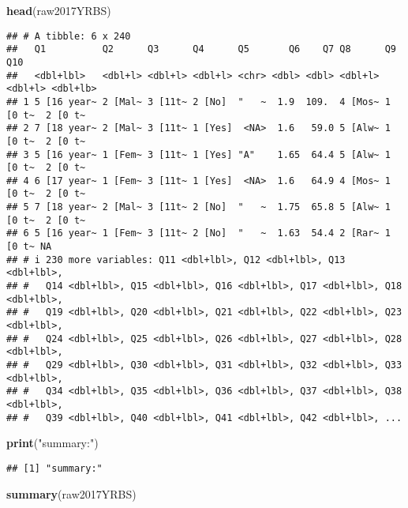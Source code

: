 \documentclass[
]{article}
\newenvironment{Shaded}{\begin{snugshade}}{\end{snugshade}}
\newcommand{\FunctionTok}[1]{\textcolor[rgb]{0.13,0.29,0.53}{\textbf{#1}}}
\newcommand{\NormalTok}[1]{#1}
\newcommand{\StringTok}[1]{\textcolor[rgb]{0.31,0.60,0.02}{#1}}
\begin{document}
\begin{Shaded}
\begin{Highlighting}[]
\FunctionTok{head}\NormalTok{(raw2017YRBS)}
\end{Highlighting}
\end{Shaded}

\begin{verbatim}
## # A tibble: 6 x 240
##   Q1          Q2      Q3      Q4      Q5       Q6    Q7 Q8      Q9      Q10     
##   <dbl+lbl>   <dbl+l> <dbl+l> <dbl+l> <chr> <dbl> <dbl> <dbl+l> <dbl+l> <dbl+lb>
## 1 5 [16 year~ 2 [Mal~ 3 [11t~ 2 [No]  "   ~  1.9  109.  4 [Mos~ 1 [0 t~  2 [0 t~
## 2 7 [18 year~ 2 [Mal~ 3 [11t~ 1 [Yes]  <NA>  1.6   59.0 5 [Alw~ 1 [0 t~  2 [0 t~
## 3 5 [16 year~ 1 [Fem~ 3 [11t~ 1 [Yes] "A"    1.65  64.4 5 [Alw~ 1 [0 t~  2 [0 t~
## 4 6 [17 year~ 1 [Fem~ 3 [11t~ 1 [Yes]  <NA>  1.6   64.9 4 [Mos~ 1 [0 t~  2 [0 t~
## 5 7 [18 year~ 2 [Mal~ 3 [11t~ 2 [No]  "   ~  1.75  65.8 5 [Alw~ 1 [0 t~  2 [0 t~
## 6 5 [16 year~ 1 [Fem~ 3 [11t~ 2 [No]  "   ~  1.63  54.4 2 [Rar~ 1 [0 t~ NA      
## # i 230 more variables: Q11 <dbl+lbl>, Q12 <dbl+lbl>, Q13 <dbl+lbl>,
## #   Q14 <dbl+lbl>, Q15 <dbl+lbl>, Q16 <dbl+lbl>, Q17 <dbl+lbl>, Q18 <dbl+lbl>,
## #   Q19 <dbl+lbl>, Q20 <dbl+lbl>, Q21 <dbl+lbl>, Q22 <dbl+lbl>, Q23 <dbl+lbl>,
## #   Q24 <dbl+lbl>, Q25 <dbl+lbl>, Q26 <dbl+lbl>, Q27 <dbl+lbl>, Q28 <dbl+lbl>,
## #   Q29 <dbl+lbl>, Q30 <dbl+lbl>, Q31 <dbl+lbl>, Q32 <dbl+lbl>, Q33 <dbl+lbl>,
## #   Q34 <dbl+lbl>, Q35 <dbl+lbl>, Q36 <dbl+lbl>, Q37 <dbl+lbl>, Q38 <dbl+lbl>,
## #   Q39 <dbl+lbl>, Q40 <dbl+lbl>, Q41 <dbl+lbl>, Q42 <dbl+lbl>, ...
\end{verbatim}

\begin{Shaded}
\begin{Highlighting}[]
\FunctionTok{print}\NormalTok{(}\StringTok{"summary:"}\NormalTok{)}
\end{Highlighting}
\end{Shaded}

\begin{verbatim}
## [1] "summary:"
\end{verbatim}

\begin{Shaded}
\begin{Highlighting}[]
\FunctionTok{summary}\NormalTok{(raw2017YRBS)}
\end{Highlighting}
\end{Shaded}
\end{document}
